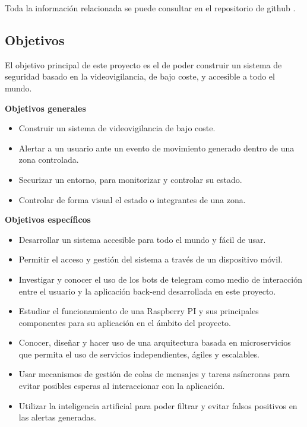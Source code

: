 Toda la información relacionada se puede consultar en el repositorio de github \cite{ref1}.

\subsection{Objetivos}

El objetivo principal de este proyecto es el de poder construir un sistema de seguridad basado en la videovigilancia, de bajo coste, y accesible a todo el mundo.

\textbf{Objetivos generales}

\vspace{-0.3cm}

\begin{itemize}
	\item Construir un sistema de videovigilancia de bajo coste.
	\item Alertar a un usuario ante un evento de movimiento generado dentro de una zona controlada.
	\item Securizar un entorno, para monitorizar y controlar su estado.
	\item Controlar de forma visual el estado o integrantes de una zona.
\end{itemize}

\textbf{Objetivos específicos}

\vspace{-0.3cm}

\begin{itemize}
	\item Desarrollar un sistema accesible para todo el mundo y fácil de usar.
	\item Permitir el acceso y gestión del sistema a través de un dispositivo móvil.
	\item Investigar y conocer el uso de los bots de telegram como medio de interacción entre el usuario y la aplicación back-end desarrollada en este proyecto.
	\item Estudiar el funcionamiento de una Raspberry PI y sus principales componentes para su aplicación en el ámbito del proyecto.
	\item Conocer, diseñar y hacer uso de una arquitectura basada en microservicios que permita el uso de servicios independientes, ágiles y escalables.
	\item Usar mecanismos de gestión de colas de mensajes y tareas asíncronas para evitar posibles esperas al interaccionar con la aplicación.
	\item Utilizar la inteligencia artificial para poder filtrar y evitar falsos positivos en las alertas generadas.

\end{itemize}

